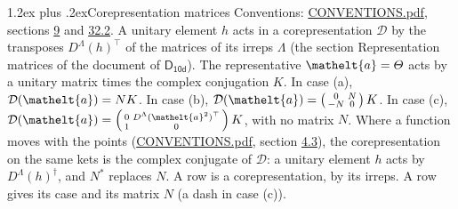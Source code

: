 \documentclass[10pt,a4paper]{article}
\makeatletter
\renewcommand\section{\@startsection{section}{1}{\z@}{-3ex plus -1ex minus -.2ex}%
  {1.2ex plus .2ex}{\normalfont\large\sffamily\bfseries\color{parttitle}}}
\numberwithin{equation}{section}
\newcommand{\eltfont}[1]{{\let\sigma\eltsigma\mathelt{#1}}}
\newcommand{\grp}[1]{\mathsf{#1}}
\newcommand{\elt}[1]{\eltfont{#1}}
\makeatother
\begin{document}
\section{Corepresentation matrices}\label{s:corep_matrices}
Conventions: \href{../../CONVENTIONS.pdf}{CONVENTIONS.pdf}, sections \href{../../../rotation/CONVENTIONS.pdf\#conv.9}{9} and \href{../../CONVENTIONS.pdf\#conv.32.2}{32.2}.
A unitary element $h$ acts in a corepresentation $\mathcal{D}$ by the transposes $D^{\Lambda}(h)^{\top}$ of the matrices of its irreps $\Lambda$ (the section Representation matrices of the document of \href{../../../rotation/data/pdf/D10d.pdf}{$\grp{D_{10d}}$}). The representative $\elt{a} = \varTheta$ acts by a unitary matrix times the complex conjugation $K$.
In case (a), $\mathcal{D}(\elt{a}) = NK$. In case (b), $\mathcal{D}(\elt{a}) = \left(\begin{smallmatrix} 0 & N \\ -N & 0 \end{smallmatrix}\right) K$. In case (c), $\mathcal{D}(\elt{a}) = \left(\begin{smallmatrix} 0 & D^{\Lambda}(\elt{a}^2)^{\top} \\ 1 & 0 \end{smallmatrix}\right) K$, with no matrix $N$.
Where a function moves with the points (\href{../../CONVENTIONS.pdf}{CONVENTIONS.pdf}, section \href{../../../rotation/CONVENTIONS.pdf\#conv.4.3}{4.3}), the corepresentation on the same kets is the complex conjugate of $\mathcal{D}$: a unitary element $h$ acts by $D^{\Lambda}(h)^{\dagger}$, and $N^{*}$ replaces $N$.
A row is a corepresentation, by its irreps. A row gives its case and its matrix $N$ (a dash in case (c)).
\end{document}
